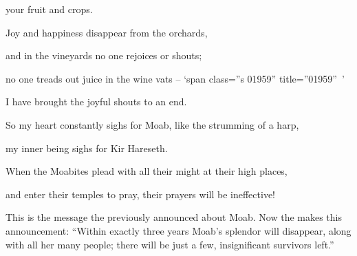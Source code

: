 {your fruit
and crops.
\par }{\Q {}Joy
and happiness
disappear
from
the orchards,
\par }{\Q and in the vineyards
no
one rejoices
or
shouts;
\par }{\Q no
one treads out
juice in the wine
vats – ‘span class=”s 01959” title=”01959” ’
\par }{\Q I have brought the joyful shouts
to an end.
\par }{\PP \par }{\Q {}So
my heart
constantly sighs for Moab,
like the strumming
of a harp,
\par }{\Q my inner
being sighs for Kir Hareseth.
\par }{\Q {}When
the Moabites
plead
with all
their might
at their high places,
\par }{\Q and enter
their temples
to
pray,
their prayers will be ineffective!
\par }{\PP {}This
is the message
the
{}
previously
announced
about Moab.
Now
the {}
makes
this announcement: “Within exactly three
years
Moab’s
splendor
will disappear,
along with all
her many
people;
there will be just
a few,
insignificant
survivors left.”

}
